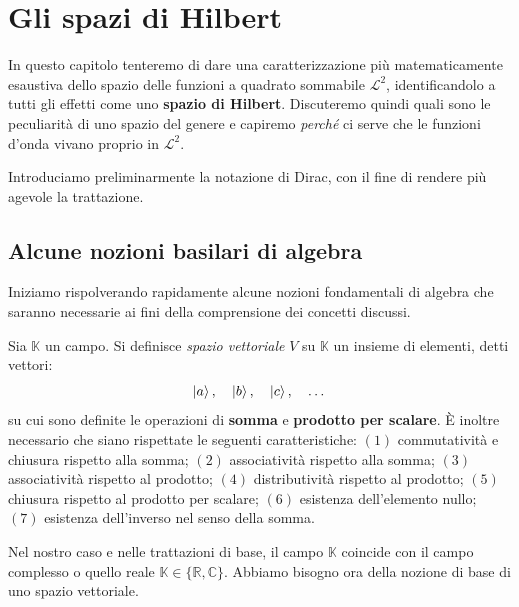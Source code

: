
\chapter{Gli spazi di Hilbert}
In questo capitolo tenteremo di dare una caratterizzazione più matematicamente esaustiva dello spazio delle funzioni a quadrato sommabile $\mathcal{L}^2$, identificandolo a tutti gli effetti come uno \textbf{spazio di Hilbert}. Discuteremo quindi quali sono le peculiarità di uno spazio del genere e capiremo \emph{perché} ci serve che le funzioni d'onda vivano proprio in $\mathcal{L}^2$. 

Introduciamo preliminarmente la notazione di Dirac, con il fine di rendere più agevole la trattazione.

\section{Alcune nozioni basilari di algebra}
Iniziamo rispolverando rapidamente alcune nozioni fondamentali di algebra che saranno necessarie ai fini della comprensione dei concetti discussi. 

\begin{definizione}
    Sia $\mathbb{K}$ un campo. Si definisce \emph{spazio vettoriale} $V$ su $\mathbb{K}$ un insieme di elementi, detti vettori:
    \[
        \ket{a}, \quad \ket{b}, \quad \ket{c}, \quad \dots
    \]
    su cui sono definite le operazioni di \textbf{somma} e \textbf{prodotto per scalare}. È inoltre necessario che siano rispettate le seguenti caratteristiche: $(1)$ commutatività e chiusura rispetto alla somma; $(2)$ associatività rispetto alla somma; $(3)$ associatività rispetto al prodotto; $(4)$ distributività rispetto al prodotto; $(5)$ chiusura rispetto al prodotto per scalare; $(6)$ esistenza dell'elemento nullo; $(7)$ esistenza dell'inverso nel senso della somma.
\end{definizione}
Nel nostro caso e nelle trattazioni di base, il campo $\mathbb{K}$ coincide con il campo complesso o quello reale $\mathbb{K} \in \{ \mathbb{R}, \mathbb{C} \}$. Abbiamo bisogno ora della nozione di base di uno spazio vettoriale.

